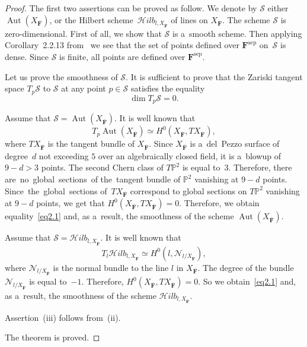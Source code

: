 \documentclass{amsart}
\numberwithin{equation}{section}
\theoremstyle{plain}
\theoremstyle{definition}
\theoremstyle{remark}
\begin{document}
\begin{proof}
The first two assertions can be proved as follow. We denote by $\mathcal{S}$ either~$\operatorname{Aut}(X_{\overline{\mathbf{F}}})$, or the Hilbert scheme~$\mathcal{H}ilb_{l,X_{\overline{\mathbf{F}}}}$ of lines on $X_{\overline{\mathbf{F}}}$. The scheme $\mathcal{S}$ is zero-\allowbreak dimensional. First of all, we show that $\mathcal{S}$ is a~smooth scheme. Then applying Corollary~2.2.13 from~\cite{3} we see that the set of points defined over $\mathbf{F}^{\mathrm{sep}}$ on~$\mathcal{S}$ is dense. Since $\mathcal{S}$ is finite, all points are defined over $\mathbf{F}^{\mathrm{sep}}$.

Let us prove the smoothness of $\mathcal{S}$. It is sufficient to prove that the Zariski tangent space $T_p\mathcal{S}$ to $\mathcal{S}$ at any point $p \in \mathcal{S}$ satisfies the equality
\begin{equation}
\label{eq2.1}
\dim T_p \mathcal{S}=0.
\end{equation}

Assume that $\mathcal{S}=\operatorname{Aut}(X_{\overline{\mathbf{F}}})$. It is well known that
$$
T_p \operatorname{Aut}(X_{\overline{\mathbf{F}}}) \simeq H^0(X_{\overline{\mathbf{F}}}, TX_{\overline{\mathbf{F}}}),
$$
where $TX_{\overline{\mathbf{F}}}$ is the tangent bundle of $X_{\overline{\mathbf{F}}}$. Since $X_{\overline{\mathbf{F}}}$ is a~del~Pezzo surface of degree~$d$ not exceeding $5$ over an algebraically closed field, it is a~blowup of $9-d>3$ points. The second Chern class of $T{\mathbb{P}^2}$ is equal to~$3$. Therefore, there are~no~global~sections~of the~tangent bundle of $\mathbb{P}^2$ vanishing at $9-d$ points. Since~the~global~sections of~$TX_{\overline{\mathbf{F}}}$ correspond to global sections on $T\mathbb{P}^2$ vanishing at $9-d$ points, we get that $ H^0(X_{\overline{\mathbf{F}}}, TX_{\overline{\mathbf{F}}})=0$. Therefore, we obtain equality~\eqref{eq2.1} and, as a~result, the smoothness of the scheme $\operatorname{Aut}(X_{\overline{\mathbf{F}}})$.

Assume that $\mathcal{S}=\mathcal{H}ilb_{l,X_{\overline{\mathbf{F}}}}$. It is well known that
$$
T_l \mathcal{H}ilb_{l,X_{\overline{\mathbf{F}}}} \simeq H^0(l, \mathcal{N}_{l/X_{\overline{\mathbf{F}}}}),
$$
where $\mathcal{N}_{l/X_{\overline{\mathbf{F}}}}$ is the normal bundle to the line $l$ in $X_{\overline{\mathbf{F}}}$. The degree of the bundle~$\mathcal{N}_{l/X_{\overline{\mathbf{F}}}}$ is equal to~$-1$. Therefore, $H^0(X_{\overline{\mathbf{F}}}, TX_{\overline{\mathbf{F}}})=0$. So we obtain~\eqref{eq2.1} and, as a~result, the smoothness of the scheme $\mathcal{H}ilb_{l,X_{\overline{\mathbf{F}}}}$.

Assertion~(iii) follows from~(ii).

The theorem is proved.
\end{proof}
\end{document}
